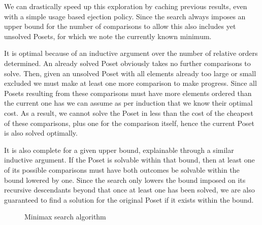 \documentclass[10pt,journal,compsoc]{IEEEtran}
\begin{document}
We can drastically speed up this exploration by caching previous results, even with a simple usage
based ejection policy. Since the search always imposes an upper bound for the number of comparisons
to allow this also includes yet unsolved Posets, for which we note the currently known minimum.

It is optimal because of an inductive argument over the number of relative orders determined. An
already solved Poset obviously takes no further comparisons to solve. Then, given an unsolved Poset
with all elements already too large or small excluded we must make at least one more comparison to
make progress. Since all Posets resulting from these comparisons must have more elements ordered
than the current one has we can assume as per induction that we know their optimal cost. As a result, we
cannot solve the Poset in less than the cost of the cheapest of these comparisons, plus one for the
comparison itself, hence the current Poset is also solved optimally.

It is also complete for a given upper bound, explainable through a similar inductive argument. If
the Poset is solvable within that bound, then at least one of its possible comparisons must have both
outcomes be solvable within the bound lowered by one. Since the search only lowers the bound imposed
on its recursive descendants beyond that once at least one has been solved, we are also guaranteed
to find a solution for the original Poset if it exists within the bound.


\begin{figure}
  \caption{Minimax search algorithm} \label{fig:minimax_search}
\end{figure}
\end{document}
